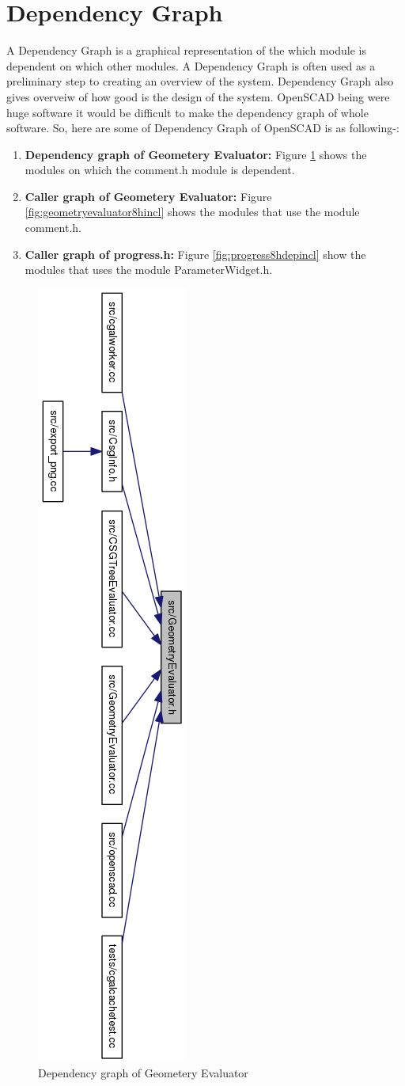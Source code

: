 \section{Dependency Graph}
A Dependency Graph is a graphical representation of the which module is dependent on which other modules. A Dependency Graph is often used as a preliminary step to creating an overview of the system. Dependency Graph also gives overveiw of how good is the design of the system.
OpenSCAD being were huge software it would be difficult to make the dependency graph of whole software. So, here are some of Dependency Graph of OpenSCAD is as following-:
\begin{enumerate}
	\item \textbf{Dependency graph of Geometery Evaluator:} Figure \ref{fig:geometryevaluator8hdepincl} shows the modules on which the comment.h module is dependent.
	\item \textbf{Caller graph of Geometery Evaluator:} Figure \ref{fig:geometryevaluator8hincl} shows the modules that use the module comment.h.
	\item \textbf{Caller graph of progress.h:} Figure \ref{fig:progress8hdepincl} show the modules that uses the module ParameterWidget.h.
\end{enumerate}

\begin{figure}
	\centering
	\includegraphics[height=1.37\columnwidth]{images/GeometryEvaluator_8h__dep__incl}
	\caption{Dependency graph of Geometery Evaluator}
	\label{fig:geometryevaluator8hdepincl}
\end{figure}

